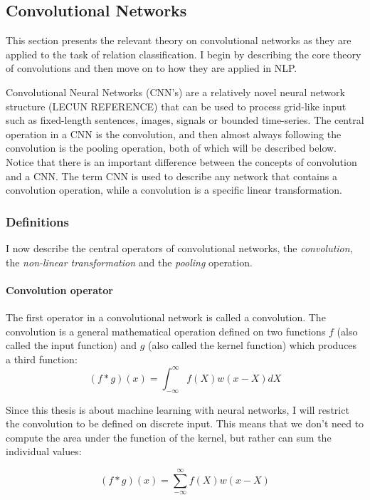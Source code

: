 

\subsection{Convolutional Networks}

This section presents the relevant theory on convolutional networks as they are applied to the task of relation classification. I begin by describing the core theory of convolutions and then move on to how they are applied in NLP. 

Convolutional Neural Networks (CNN's) are a relatively novel neural network structure (LECUN REFERENCE) that can be used to process grid-like input such as fixed-length sentences, images, signals or bounded time-series. The central operation in a CNN is the convolution, and then almost always following the convolution is the pooling operation, both of which will be described below. Notice that there is an important difference between the concepts of convolution and a CNN. The term CNN is used to describe any network that contains a convolution operation, while a convolution is a specific linear transformation. 

\subsubsection{Definitions}

I now describe the central operators of convolutional networks, the \emph{convolution}, the \emph{non-linear transformation} and the \emph{pooling} operation. 


\paragraph{Convolution operator}

The first operator in a convolutional network is called a convolution. The convolution is a general mathematical operation defined on two functions $f$ (also called the input function) and $g$ (also called the kernel function) which produces a third function:
$$
(f * g) (x) = \int_{-\infty}^{\infty} f(X)w(x-X)dX
$$ 

Since this thesis is about machine learning with neural networks, I will restrict the convolution to be defined on discrete input. This means that we don't need to compute the area under the function of the kernel, but rather can sum the individual values:

$$
(f * g) (x) = \sum_{-\infty}^{\infty} f(X)w(x-X)
$$

